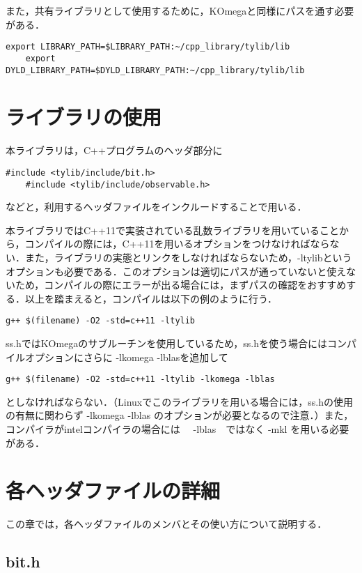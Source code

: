 \documentclass[report, 11pt, uplatex]{jsbook}
\begin{document}
	また，共有ライブラリとして使用するために，KOmegaと同様にパスを通す必要がある．
	\begin{lstlisting}[basicstyle=\ttfamily\footnotesize, frame=single]
	export LIBRARY_PATH=$LIBRARY_PATH:~/cpp_library/tylib/lib
	export DYLD_LIBRARY_PATH=$DYLD_LIBRARY_PATH:~/cpp_library/tylib/lib
	\end{lstlisting}
	
	\chapter{ライブラリの使用}
	本ライブラリは，C++プログラムのヘッダ部分に
	\begin{lstlisting}[basicstyle=\ttfamily\footnotesize, frame=single]
	#include <tylib/include/bit.h>
	#include <tylib/include/observable.h>
	\end{lstlisting}
	などと，利用するヘッダファイルをインクルードすることで用いる．
	
	本ライブラリではC++11で実装されている乱数ライブラリを用いていることから，コンパイルの際には，C++11を用いるオプションをつけなければならない．また，ライブラリの実態とリンクをしなければならないため，-ltylibというオプションも必要である．このオプションは適切にパスが通っていないと使えないため，コンパイルの際にエラーが出る場合には，まずパスの確認をおすすめする．以上を踏まえると，コンパイルは以下の例のように行う．
	\begin{lstlisting}[basicstyle=\ttfamily\footnotesize, frame=single]
	g++ $(filename) -O2 -std=c++11 -ltylib
	\end{lstlisting}
	
	ss.hではKOmegaのサブルーチンを使用しているため，ss.hを使う場合にはコンパイルオプションにさらに -lkomega -lblasを追加して
	\begin{lstlisting}[basicstyle=\ttfamily\footnotesize, frame=single]
	g++ $(filename) -O2 -std=c++11 -ltylib -lkomega -lblas
	\end{lstlisting}
	としなければならない．（Linuxでこのライブラリを用いる場合には，ss.hの使用の有無に関わらず -lkomega -lblas のオプションが必要となるので注意．）また，コンパイラがintelコンパイラの場合には　 -lblas　ではなく -mkl を用いる必要がある．
	
	\chapter{各ヘッダファイルの詳細}
	この章では，各ヘッダファイルのメンバとその使い方について説明する．
	
	\section{bit.h}
\end{document}
